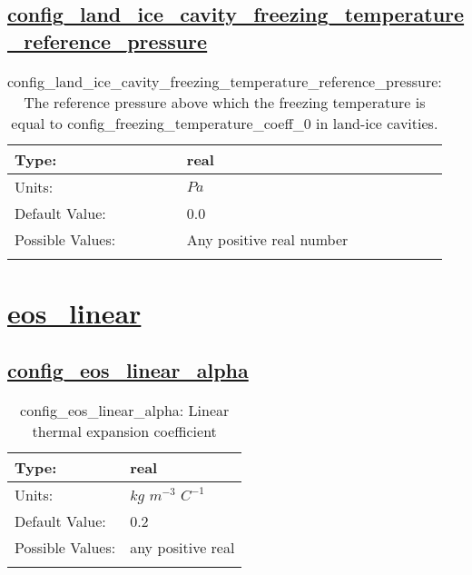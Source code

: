 \subsection[config\_land\_ice\_cavity\_freezing\_temperature\_reference\_pressure]{\hyperref[sec:nm_tab_eos]{config\_land\_ice\_cavity\_freezing\_temperature\_reference\_pressure}}
\label{subsec:nm_sec_config_land_ice_cavity_freezing_temperature_reference_pressure}
\begin{center}
\begin{longtable}{| p{2.0in} || p{4.0in} |}
    \hline
    Type: & real \\
    \hline
    Units: & $Pa$ \\
    \hline
    Default Value: & 0.0 \\
    \hline
    Possible Values: & Any positive real number \\
    \hline
    \caption{config\_land\_ice\_cavity\_freezing\_temperature\_reference\_pressure: The reference pressure above which the freezing temperature is equal to config\_freezing\_temperature\_coeff\_0 in land-ice cavities.}
\end{longtable}
\end{center}
\section[eos\_linear]{\hyperref[sec:nm_tab_eos_linear]{eos\_linear}}
\label{sec:nm_sec_eos_linear}
\subsection[config\_eos\_linear\_alpha]{\hyperref[sec:nm_tab_eos_linear]{config\_eos\_linear\_alpha}}
\label{subsec:nm_sec_config_eos_linear_alpha}
\begin{center}
\begin{longtable}{| p{2.0in} || p{4.0in} |}
    \hline
    Type: & real \\
    \hline
    Units: & $kg$ $m^{-3}$ $C^{-1}$ \\
    \hline
    Default Value: & 0.2 \\
    \hline
    Possible Values: & any positive real \\
    \hline
    \caption{config\_eos\_linear\_alpha: Linear thermal expansion coefficient}
\end{longtable}
\end{center}
